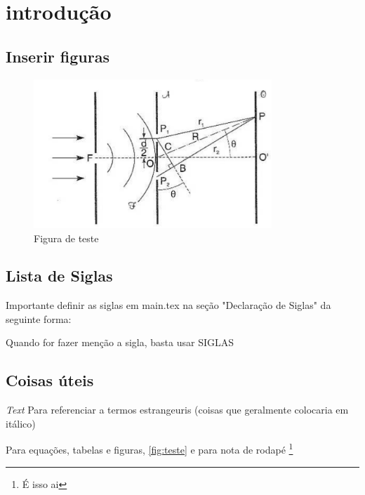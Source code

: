 \chapter{introdução}

\section{Inserir figuras}

\begin{figure}[htb]
  \caption{\label{fig:teste} Figura de teste}
  \centering
  \includegraphics[width=0.8\textwidth]{images/teste.png}
\end{figure}

\section{Lista de Siglas}
Importante definir as siglas em main.tex  na seção "Declaração de Siglas" da seguinte forma:


Quando for fazer menção a sigla, basta usar \gls{SIGLAS}

\section{Coisas úteis}

\emph{Text} Para referenciar a termos estrangeuris (coisas que geralmente colocaria em itálico) \cite{moyses2}
\nocite{halliday4}

Para equações, tabelas e figuras, \autoref{fig:teste} e para nota de rodapé \footnote{É isso ai}



